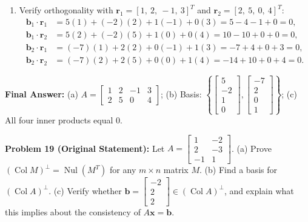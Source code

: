 \documentclass[11pt, letterpaper]{article}
\theoremstyle{definition}
\theoremstyle{remark}
\begin{document}
\begin{enumerate}[label=(\alph*)]
    \item Verify orthogonality with $\mathbf{r}_1 = [1,\ 2,\ -1,\ 3]^T$ and $\mathbf{r}_2 = [2,\ 5,\ 0,\ 4]^T$:
    \begin{align*}
    \mathbf{b}_1 \cdot \mathbf{r}_1 &= 5(1) + (-2)(2) + 1(-1) + 0(3) = 5 - 4 - 1 + 0 = 0, \\
    \mathbf{b}_1 \cdot \mathbf{r}_2 &= 5(2) + (-2)(5) + 1(0) + 0(4) = 10 - 10 + 0 + 0 = 0, \\
    \mathbf{b}_2 \cdot \mathbf{r}_1 &= (-7)(1) + 2(2) + 0(-1) + 1(3) = -7 + 4 + 0 + 3 = 0, \\
    \mathbf{b}_2 \cdot \mathbf{r}_2 &= (-7)(2) + 2(5) + 0(0) + 1(4) = -14 + 10 + 0 + 4 = 0.
    \end{align*}
\end{enumerate}
\textbf{Final Answer:} (a) $A = \begin{bmatrix} 1 & 2 & -1 & 3 \\ 2 & 5 & 0 & 4 \end{bmatrix}$; (b) Basis: $\left\{ \begin{bmatrix} 5 \\ -2 \\ 1 \\ 0 \end{bmatrix}, \begin{bmatrix} -7 \\ 2 \\ 0 \\ 1 \end{bmatrix} \right\}$; (c) All four inner products equal $0$.

\medskip
\textbf{Problem 19 (Original Statement):} Let $A = \begin{bmatrix} 1 & -2 \\ 2 & -3 \\ -1 & 1 \end{bmatrix}$. (a) Prove $(\operatorname{Col} M)^{\perp} = \operatorname{Nul}(M^T)$ for any $m \times n$ matrix $M$. (b) Find a basis for $(\operatorname{Col} A)^{\perp}$. (c) Verify whether $\mathbf{b} = \begin{bmatrix} -2 \\ 2 \\ 2 \end{bmatrix} \in (\operatorname{Col} A)^{\perp}$, and explain what this implies about the consistency of $A\mathbf{x} = \mathbf{b}$.
\end{document}
